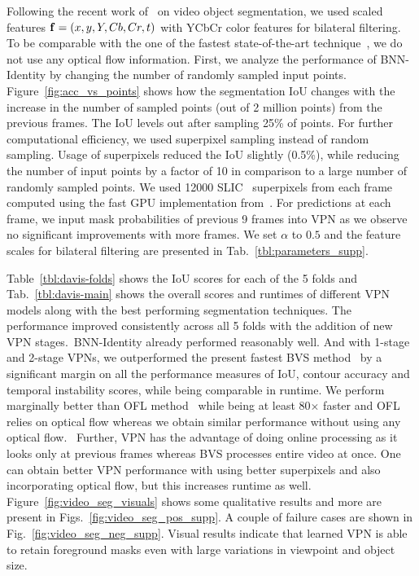 Following the recent work of~\cite{marki2016bilateral} on video object segmentation,
we used scaled features $\mathbf{f}=(x,y,Y,Cb,Cr,t)$ with YCbCr color features for bilateral filtering.
To be comparable with the one of the fastest state-of-the-art technique~\cite{marki2016bilateral},
we do not use any optical flow information. First, we analyze the performance of BNN-Identity by changing the number of randomly sampled input points. Figure~\ref{fig:acc_vs_points} shows how the segmentation IoU changes with the increase
in the number of sampled points (out of 2 million points) from the previous frames.
The IoU levels out after sampling 25\% of points. For
further computational efficiency, we used superpixel sampling instead of random
sampling. Usage of superpixels reduced the IoU slightly (0.5\%), while reducing the
number of input points by a factor of 10 in comparison to a large number
of randomly sampled points. We used 12000 SLIC~\cite{achanta2012slic} superpixels from each frame
computed using the fast GPU implementation from~\cite{gSLICr_2015}. For predictions
at each frame, we input mask probabilities of previous 9 frames into VPN as we observe
no significant improvements with more frames. We set $\alpha$ to $0.5$ and the
feature scales for bilateral filtering are presented in Tab.~\ref{tbl:parameters_supp}.

Table~\ref{tbl:davis-folds} shows the IoU scores for each of the 5 folds and
Tab.~\ref{tbl:davis-main} shows the overall scores and runtimes of different VPN
models along with the best performing segmentation techniques.
The performance improved consistently across all 5 folds with the addition of new VPN stages.~BNN-Identity already performed reasonably well.
And with 1-stage and 2-stage VPNs, we outperformed the present fastest
BVS method~\cite{marki2016bilateral} by a significant margin on all
the performance measures of IoU, contour accuracy and temporal instability scores,
while being comparable in runtime. We perform marginally better than OFL method~\cite{tsaivideo}
while being at least 80$\times$ faster and OFL relies on optical flow whereas we
obtain similar performance without using any optical flow.
~Further, VPN has the advantage of doing online processing
as it looks only at previous frames whereas BVS processes entire video at once.
One can obtain better VPN performance with using better superpixels and
also incorporating optical flow, but this increases runtime as well.
Figure~\ref{fig:video_seg_visuals} shows some qualitative results and more are present
in Figs.~\ref{fig:video_seg_pos_supp}. A couple of
failure cases are shown in Fig.~\ref{fig:video_seg_neg_supp}. Visual results indicate that learned VPN is able to retain foreground masks even with large variations in viewpoint and object size.

